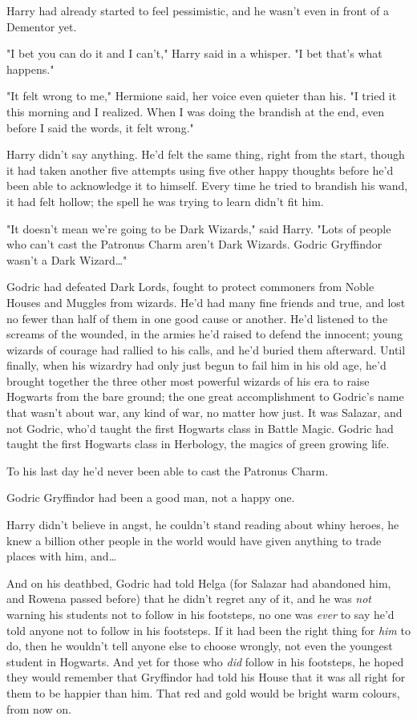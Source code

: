Harry had already started to feel pessimistic, and he wasn't even in front of a
Dementor yet.

"I bet you can do it and I can't," Harry said in a whisper. "I bet that's what
happens."

"It felt wrong to me," Hermione said, her voice even quieter than his. "I tried
it this morning and I realized. When I was doing the brandish at the end, even
before I said the words, it felt wrong."

Harry didn't say anything. He'd felt the same thing, right from the start,
though it had taken another five attempts using five other happy thoughts
before he'd been able to acknowledge it to himself. Every time he tried to
brandish his wand, it had felt hollow; the spell he was trying to learn didn't
fit him.

"It doesn't mean we're going to be Dark Wizards," said Harry. "Lots of people
who can't cast the Patronus Charm aren't Dark Wizards. Godric Gryffindor wasn't
a Dark Wizard…"

Godric had defeated Dark Lords, fought to protect commoners from Noble Houses
and Muggles from wizards. He'd had many fine friends and true, and lost no fewer
than half of them in one good cause or another. He'd listened to the screams of
the wounded, in the armies he'd raised to defend the innocent; young wizards of
courage had rallied to his calls, and he'd buried them afterward. Until
finally, when his wizardry had only just begun to fail him in his old age, he'd
brought together the three other most powerful wizards of his era to raise
Hogwarts from the bare ground; the one great accomplishment to Godric's name
that wasn't about war, any kind of war, no matter how just. It was Salazar, and
not Godric, who'd taught the first Hogwarts class in Battle Magic. Godric had
taught the first Hogwarts class in Herbology, the magics of green growing life.

To his last day he'd never been able to cast the Patronus Charm.

Godric Gryffindor had been a good man, not a happy one.

Harry didn't believe in angst, he couldn't stand reading about whiny heroes, he
knew a billion other people in the world would have given anything to trade
places with him, and…

And on his deathbed, Godric had told Helga (for Salazar had abandoned him, and
Rowena passed before) that he didn't regret any of it, and he was \emph{not}
warning his students not to follow in his footsteps, no one was \emph{ever} to
say he'd told anyone not to follow in his footsteps. If it had been the right
thing for \emph{him} to do, then he wouldn't tell anyone else to choose
wrongly, not even the youngest student in Hogwarts. And yet for those who
\emph{did} follow in his footsteps, he hoped they would remember that
Gryffindor had told his House that it was all right for them to be happier than
him. That red and gold would be bright warm colours, from now on.

